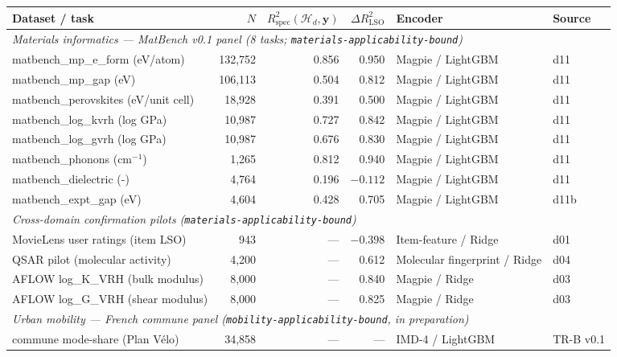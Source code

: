 \documentclass[11pt,a4paper]{article}
\theoremstyle{plain}
\theoremstyle{definition}
\theoremstyle{remark}
\newcommand{\by}{\mathbf{y}}
\newcommand{\Rspec}{R^2_{\mathrm{spec}}}
\newcommand{\Hcal}{\mathcal{H}}
\begin{document}
\begin{table}[t]
\centering
\small
\begin{tabular}{lrrrll}
\toprule
\textbf{Dataset / task}                       & $N$        & $\Rspec(\Hcal_d, \by)$ & $\Delta R^2_{\mathrm{LSO}}$ & \textbf{Encoder} & \textbf{Source} \\
\midrule
\multicolumn{6}{l}{\emph{Materials informatics --- MatBench v0.1 panel
(8 tasks; \texttt{materials-applicability-bound})}}\\
\quad matbench\_mp\_e\_form (eV/atom)       & 132{,}752  & 0.856 & 0.950  & Magpie / LightGBM & d11 \\
\quad matbench\_mp\_gap (eV)                & 106{,}113  & 0.504 & 0.812  & Magpie / LightGBM & d11 \\
\quad matbench\_perovskites (eV/unit cell)  &  18{,}928  & 0.391 & 0.500  & Magpie / LightGBM & d11 \\
\quad matbench\_log\_kvrh (log GPa)         &  10{,}987  & 0.727 & 0.842  & Magpie / LightGBM & d11 \\
\quad matbench\_log\_gvrh (log GPa)         &  10{,}987  & 0.676 & 0.830  & Magpie / LightGBM & d11 \\
\quad matbench\_phonons (cm$^{-1}$)         &   1{,}265  & 0.812 & 0.940  & Magpie / LightGBM & d11 \\
\quad matbench\_dielectric (-)              &   4{,}764  & 0.196 & $-0.112$ & Magpie / LightGBM & d11 \\
\quad matbench\_expt\_gap (eV)              &   4{,}604  & 0.428 & 0.705  & Magpie / LightGBM & d11b \\
\midrule
\multicolumn{6}{l}{\emph{Cross-domain confirmation pilots (\texttt{materials-applicability-bound})}}\\
\quad MovieLens user ratings (item LSO)     &      943   & ---   & $-0.398$ & Item-feature / Ridge & d01 \\
\quad QSAR pilot (molecular activity)       &   4{,}200  & ---   & 0.612  & Molecular fingerprint / Ridge & d04 \\
\quad AFLOW log\_K\_VRH (bulk modulus)      &   8{,}000  & ---   & 0.840  & Magpie / Ridge & d03 \\
\quad AFLOW log\_G\_VRH (shear modulus)     &   8{,}000  & ---   & 0.825  & Magpie / Ridge & d03 \\
\midrule
\multicolumn{6}{l}{\emph{Urban mobility --- French commune panel
(\texttt{mobility-applicability-bound}, in preparation)}}\\
\quad commune mode-share (Plan V\'elo)      &  34{,}858  & ---   & ---    & IMD-4 / LightGBM & TR-B v0.1 \\

\end{tabular}
\end{table}
\end{document}
